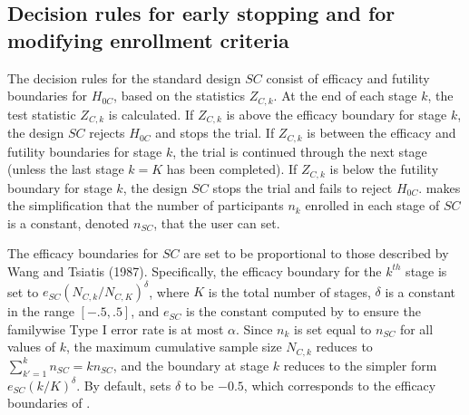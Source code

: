 \documentclass[article]{jss}
\begin{document}



\subsection{Decision rules for early stopping and for modifying enrollment criteria}
\label{sub:decisionRules}


The decision rules for the standard design $SC$ consist of efficacy and futility boundaries for $H_{0C}$, based on the statistics $Z_{C,k}$. At the end of each stage $k$,  the test statistic $Z_{C,k}$ is calculated. If $Z_{C,k}$ is above the efficacy boundary for stage $k$, the design $SC$ rejects $H_{0C}$ and stops the trial. If $Z_{C,k}$ is between the efficacy and futility boundaries for stage $k$, the trial is continued through the next stage (unless the last stage $k=K$ has been completed). If $Z_{C,k}$ is below the futility boundary for stage $k$, the design $SC$ stops the trial and fails to reject $H_{0C}$.  makes the simplification that the number of participants $n_k$ enrolled in each stage of $SC$ is a constant, denoted  $n_{SC}$, that the user can set.

The efficacy boundaries for $SC$ are set to be proportional to those described by Wang and Tsiatis (1987). Specifically, the efficacy boundary for the $k^{th}$ stage is set to $e_{SC}(N_{C,k}/N_{C,K})^{\delta}$, where $K$ is the total number of stages, $δ$ is a constant in the range $[-.5,.5]$, and $e_{SC}$ is the constant computed by    to ensure the familywise Type I error rate is at most $\alpha$. Since $n_{k}$ is set equal to $n_{SC}$ for all values of $k$, the maximum cumulative sample size $N_{C,k}$ reduces to $\sum_{k'=1}^k n_{SC}=k n_{SC}$, and the boundary at stage $k$ reduces to the simpler form $e_{SC}(k/K)^\delta$. By default,  sets $\delta$ to be $-0.5$, which corresponds to the efficacy boundaries of \cite{obrienfleming}. %
\end{document}
